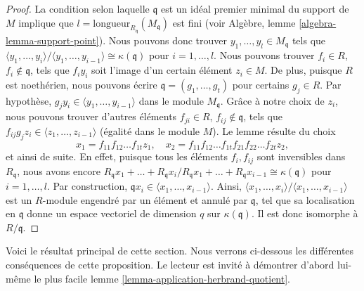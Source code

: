 \begin{proof}
La condition selon laquelle $\mathfrak q$ est un idéal premier minimal du support
de $M$ implique que $l = \text{longueur}_{R_\mathfrak q}(M_\mathfrak q)$
est fini (voir Algèbre, lemme \ref{algebra-lemma-support-point}).
Nous pouvons donc trouver $y_1, \ldots, y_l \in M_{\mathfrak q}$
tels que
$\langle y_1, \ldots, y_i\rangle / \langle y_1, \ldots, y_{i - 1}\rangle
\cong \kappa(\mathfrak q)$ pour $i = 1, \ldots, l$.
Nous pouvons trouver $f_i \in R$, $f_i \not \in \mathfrak q$, tels que
$f_i y_i$ soit l'image d'un certain élément $z_i \in M$.
De plus, puisque $R$ est noethérien, nous pouvons écrire
$\mathfrak q = (g_1, \ldots, g_t)$ pour certains $g_j \in R$.
Par hypothèse, $g_j y_i \in \langle y_1, \ldots, y_{i - 1} \rangle$
dans le module $M_{\mathfrak q}$.
Grâce à notre choix de $z_i$, nous pouvons trouver d'autres éléments
$f_{ji} \in R$, $f_{ij} \not \in \mathfrak q$, tels que
$f_{ij} g_j z_i \in \langle z_1, \ldots, z_{i - 1} \rangle$
(égalité dans le module $M$).
Le lemme résulte du choix
$$
x_1 = f_{11}f_{12}\ldots f_{1t}z_1,
\quad
x_2 = f_{11}f_{12}\ldots f_{1t}f_{21}f_{22}\ldots f_{2t}z_2,
$$
et ainsi de suite. En effet, puisque tous les éléments $f_i, f_{ij}$ sont inversibles
dans $R_{\mathfrak q}$, nous avons encore
$R_{\mathfrak q}x_1 + \ldots + R_{\mathfrak q}x_i /
R_{\mathfrak q}x_1 + \ldots + R_{\mathfrak q}x_{i - 1}
\cong \kappa(\mathfrak q)$ pour $i = 1, \ldots, l$.
Par construction, $\mathfrak q x_i \in \langle x_1, \ldots, x_{i - 1}\rangle$.
Ainsi, $\langle x_1, \ldots, x_i\rangle / \langle x_1, \ldots, x_{i - 1}\rangle$
est un $R$-module engendré par un élément et annulé par $\mathfrak q$,
tel que sa localisation en $\mathfrak q$ donne un espace vectoriel de dimension $q$
sur $\kappa(\mathfrak q)$.
Il est donc isomorphe à $R/\mathfrak q$.
\end{proof}

\noindent
Voici le résultat principal de cette section.
Nous verrons ci-dessous les différentes
conséquences de cette proposition.
Le lecteur est invité à démontrer d'abord lui-même le plus facile
lemme \ref{lemma-application-herbrand-quotient}.

